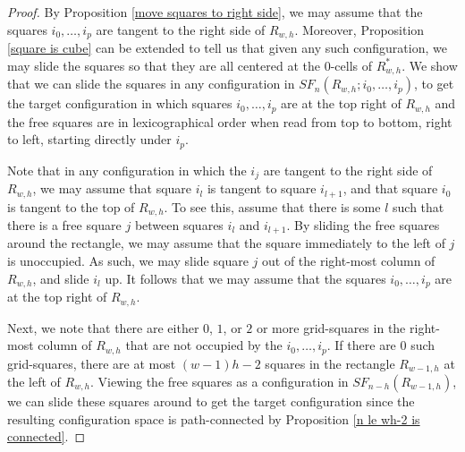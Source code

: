 \documentclass[pagebackref,colorlinks,citecolor=blue,linkcolor=blue,urlcolor=blue,filecolor=blue]{article}
\theoremstyle{definition}\newtheorem{definition}[thm]{Definition}
\theoremstyle{definition}
\begin{document}
\begin{proof}
By Proposition \ref{move squares to right side}, we may assume that the squares $i_{0}, \dots, i_{p}$ are tangent to the right side of $R_{w,h}$.
Moreover, Proposition \ref{square is cube} can be extended to tell us that given any such configuration, we may slide the squares so that they are all centered at the $0$-cells of $R^{*}_{w,h}$.
We show that we can slide the squares in any configuration in $SF_{n}(R_{w,h}; i_{0}, \dots, i_{p})$, to get the target configuration in which squares $i_{0}, \dots, i_{p}$ are at the top right of $R_{w,h}$ and the free squares are in lexicographical order when read from top to bottom, right to left, starting directly under $i_{p}$.

Note that in any configuration in which the $i_{j}$ are tangent to the right side of $R_{w,h}$, we may assume that square $i_{l}$ is tangent to square $i_{l+1}$, and that square $i_{0}$ is tangent to the top of $R_{w,h}$.
To see this, assume that there is some $l$ such that there is a free square $j$ between squares $i_{l}$ and $i_{l+1}$.
By sliding the free squares around the rectangle, we may assume that the square immediately to the left of $j$ is unoccupied.
As such, we may slide square $j$ out of the right-most column of $R_{w,h}$, and slide $i_{l}$ up.
It follows that we may assume that the squares $i_{0}, \dots, i_{p}$ are at the top right of $R_{w,h}$.

Next, we note that there are either $0$, $1$, or $2$ or more grid-squares in the right-most column of $R_{w,h}$ that are not occupied by the $i_{0}, \dots, i_{p}$.
If there are $0$ such grid-squares, there are at most $(w-1)h-2$ squares in the rectangle $R_{w-1, h}$ at the left of $R_{w,h}$.
Viewing the free squares as a configuration in $SF_{n-h}(R_{w-1,h})$, we can slide these squares around to get the target configuration since
the resulting configuration space is path-connected by Proposition \ref{n le wh-2 is connected}.


\end{proof}
\end{document}
